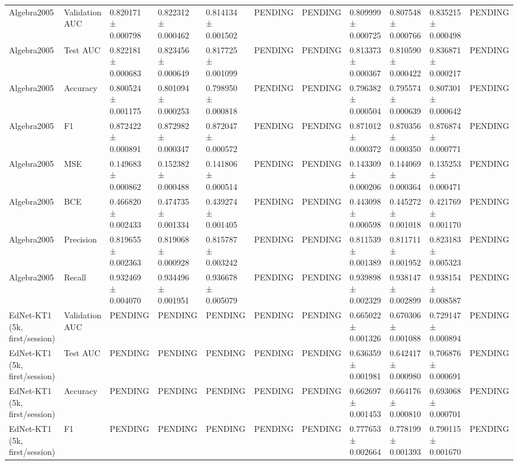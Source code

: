 \begin{longtable}{lllllllllll}
Algebra2005 & Validation AUC & 0.820171 ± 0.000798 & 0.822312 ± 0.000462 & 0.814134 ± 0.001502 & PENDING & PENDING & 0.809999 ± 0.000725 & 0.807548 ± 0.000766 & 0.835215 ± 0.000498 & PENDING \\
Algebra2005 & Test AUC & 0.822181 ± 0.000683 & 0.823456 ± 0.000649 & 0.817725 ± 0.001099 & PENDING & PENDING & 0.813373 ± 0.000367 & 0.810590 ± 0.000422 & 0.836871 ± 0.000217 & PENDING \\
Algebra2005 & Accuracy & 0.800524 ± 0.001175 & 0.801094 ± 0.000253 & 0.798950 ± 0.000818 & PENDING & PENDING & 0.796382 ± 0.000504 & 0.795574 ± 0.000639 & 0.807301 ± 0.000642 & PENDING \\
Algebra2005 & F1 & 0.872422 ± 0.000891 & 0.872982 ± 0.000347 & 0.872047 ± 0.000572 & PENDING & PENDING & 0.871012 ± 0.000372 & 0.870356 ± 0.000350 & 0.876874 ± 0.000771 & PENDING \\
Algebra2005 & MSE & 0.149683 ± 0.000862 & 0.152382 ± 0.000488 & 0.141806 ± 0.000514 & PENDING & PENDING & 0.143309 ± 0.000206 & 0.144069 ± 0.000364 & 0.135253 ± 0.000471 & PENDING \\
Algebra2005 & BCE & 0.466820 ± 0.002433 & 0.474735 ± 0.001334 & 0.439274 ± 0.001405 & PENDING & PENDING & 0.443098 ± 0.000598 & 0.445272 ± 0.001018 & 0.421769 ± 0.001170 & PENDING \\
Algebra2005 & Precision & 0.819655 ± 0.002363 & 0.819068 ± 0.000928 & 0.815787 ± 0.003242 & PENDING & PENDING & 0.811539 ± 0.001389 & 0.811711 ± 0.001952 & 0.823183 ± 0.005323 & PENDING \\
Algebra2005 & Recall & 0.932469 ± 0.004070 & 0.934496 ± 0.001951 & 0.936678 ± 0.005079 & PENDING & PENDING & 0.939898 ± 0.002329 & 0.938147 ± 0.002899 & 0.938154 ± 0.008587 & PENDING \\
EdNet-KT1 (5k, first/session) & Validation AUC & PENDING & PENDING & PENDING & PENDING & PENDING & 0.665022 ± 0.001326 & 0.670306 ± 0.001088 & 0.729147 ± 0.000894 & PENDING \\
EdNet-KT1 (5k, first/session) & Test AUC & PENDING & PENDING & PENDING & PENDING & PENDING & 0.636359 ± 0.001981 & 0.642417 ± 0.000980 & 0.706876 ± 0.000691 & PENDING \\
EdNet-KT1 (5k, first/session) & Accuracy & PENDING & PENDING & PENDING & PENDING & PENDING & 0.662697 ± 0.001453 & 0.664176 ± 0.000810 & 0.693068 ± 0.000701 & PENDING \\
EdNet-KT1 (5k, first/session) & F1 & PENDING & PENDING & PENDING & PENDING & PENDING & 0.777653 ± 0.002664 & 0.778199 ± 0.001393 & 0.790115 ± 0.001670 & PENDING \\

\end{longtable}
